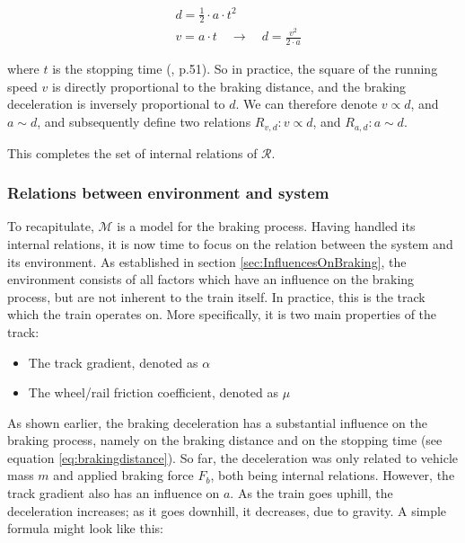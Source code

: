 \begin{equation}
\label{eq:brakingdistance}
\begin{aligned}
&d=\frac{1}{2} \cdot a \cdot t^{2} \\
&v=a \cdot t \quad \rightarrow \quad d=\frac{v^{2}}{2 \cdot a}
\end{aligned}
\end{equation}

\noindent
where $t$ is the stopping time (\cite{Cruceanu2012}, p.51). So in practice, the square of the running speed $v$ is directly proportional to the braking distance, and the braking deceleration is inversely proportional to $d$. We can therefore denote $v \propto d$, and $a \sim d$, and subsequently define two relations $R_{v,d}: v \propto d$, and $R_{a,d}: a \sim d$.
\par
This completes the set of internal relations of ${\mathcal{R}}$.

\subsubsection{Relations between environment and system}
\label{sec:RelationsEnvironmentSystem}
\par\noindent
To recapitulate, ${\mathcal{M}}$ is a model for the braking process. Having handled its internal relations, it is now time to focus on the relation between the system and its environment. As established in section \ref{sec:InfluencesOnBraking}, the environment consists of all factors which have an influence on the braking process, but are not inherent to the train itself. In practice, this is the track which the train operates on. More specifically, it is two main properties of the track:
\begin{itemize}
	\item The track gradient, denoted as $\alpha$
	\item The wheel/rail friction coefficient, denoted as $\mu$
\end{itemize}
\noindent
As shown earlier, the braking deceleration has a substantial influence on the braking process, namely on the braking distance and on the stopping time (see equation \ref{eq:brakingdistance}). So far, the deceleration was only related to vehicle mass $m$ and applied braking force $F_{b}$, both being internal relations. However, the track gradient also has an influence on $a$. As the train goes uphill, the deceleration increases; as it goes downhill, it decreases, due to gravity. A simple formula might look like this:

